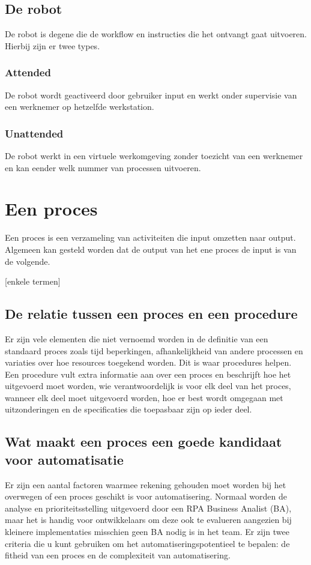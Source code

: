 \subsection{De robot}
De robot is degene die de workflow en instructies die het ontvangt gaat uitvoeren. Hierbij zijn er twee types.

\subsubsection{Attended}
De robot wordt geactiveerd door gebruiker input en werkt onder supervisie van een werknemer op hetzelfde werkstation.

\subsubsection{Unattended}
De robot werkt in een virtuele werkomgeving zonder toezicht van een werknemer en kan eender welk nummer van processen uitvoeren.

\section{Een proces}
Een proces is een verzameling van activiteiten die input omzetten naar output. Algemeen kan gesteld worden dat de output van het ene proces de input is van de volgende.

[enkele termen]

\subsection{De relatie tussen een proces en een procedure}
Er zijn vele elementen die niet vernoemd worden in de definitie van een standaard proces zoals tijd beperkingen, afhankelijkheid van andere processen en variaties over hoe resources toegekend worden. Dit is waar procedures helpen. Een procedure vult extra informatie aan over een proces en beschrijft hoe het uitgevoerd moet worden, wie verantwoordelijk is voor elk deel van het proces, wanneer elk deel moet uitgevoerd worden, hoe er best wordt omgegaan met uitzonderingen en de specificaties die toepasbaar zijn op ieder deel.

\subsection{Wat maakt een proces een goede kandidaat voor automatisatie}
Er zijn een aantal factoren waarmee rekening gehouden moet worden bij het overwegen of een proces geschikt is voor automatisering. Normaal worden de analyse en prioriteitsstelling uitgevoerd door een RPA Business Analist (BA), maar het is handig voor ontwikkelaars om deze ook te evalueren aangezien bij kleinere implementaties misschien geen BA nodig is in het team. Er zijn twee criteria die u kunt gebruiken om het automatiseringspotentieel te bepalen: de fitheid van een proces en de complexiteit van automatisering.

